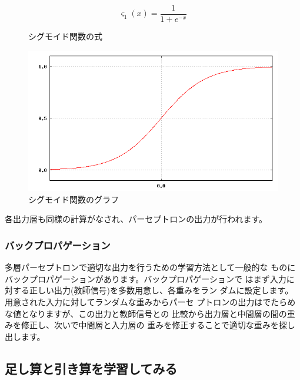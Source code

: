 \documentclass[mingoth,a4paper]{jsarticle}
\begin{document}
\begin{multicols}{2}

\begin{figure}[H]
\begin{center}
\caption{シグモイド関数の式}
\begin{equation*}
 \varsigma_1(x) = \frac{1}{1+e^{-x}}
\end{equation*}
\end{center}
\end{figure}

\begin{figure}[H]
\begin{center}
\caption{シグモイド関数のグラフ}
\includegraphics[width=1.0\hsize]{image201003/neuralnet03.png}
\end{center}
\end{figure}

\end{multicols}

各出力層も同様の計算がなされ、パーセプトロンの出力が行われます。

\subsubsection{バックプロパゲーション}

多層パーセプトロンで適切な出力を行うための学習方法として一般的な
ものにバックプロパゲーションがあります。バックプロパゲーションで
はまず入力に対する正しい出力(教師信号)を多数用意し、各重みをラン
ダムに設定します。用意された入力に対してランダムな重みからパーセ
プトロンの出力はでたらめな値となりますが、この出力と教師信号との
比較から出力層と中間層の間の重みを修正し、次いで中間層と入力層の
重みを修正することで適切な重みを探し出します。

\subsection{足し算と引き算を学習してみる}
\end{document}
